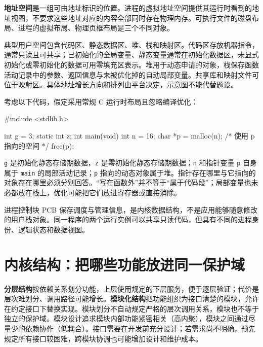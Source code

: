 \textbf{地址空间}是一组可由地址标识的位置。进程的虚拟地址空间提供其运行时看到的地址视图，不要求这些地址对应的内容全部同时存在物理内存。可执行文件的磁盘布局、进程的虚拟布局、物理页框布局是三个不同对象。

典型用户空间包含代码区、静态数据区、堆、栈和映射区。代码区存放机器指令，通常只读且可共享；已初始化的全局变量、静态变量通常在初始化数据区，未显式初始化或零初始化的数据可用零填充区表示。堆用于动态申请的对象，栈保存函数活动记录中的参数、返回信息与未被优化掉的自动局部变量。共享库和映射文件可位于映射区。具体地址增长方向和排列由平台决定，示意图不能代替题设。

考虑以下代码，假定采用常规 C 运行时布局且忽略编译优化：

\par\medskip\noindent\begin{minipage}{\linewidth}
\begin{codeblock}[language=C]
#include <stdlib.h>

int g = 3;
static int z;
int main(void) {
    int n = 16;
    char *p = malloc(n);
    /* 使用 p 指向的空间 */
    free(p);
}
\end{codeblock}
\end{minipage}\par\medskip

\texttt{g} 是初始化静态存储期数据，\texttt{z} 是零初始化静态存储期数据；\texttt{n} 和指针变量 \texttt{p} 自身属于 \texttt{main} 的局部活动记录；\texttt{p} 指向的动态对象属于堆。指针存在哪里与它指向的对象存在哪里必须分别回答。``写在函数外''并不等于``属于代码段''；局部变量也未必都放在栈上，优化可能把它们放进寄存器或直接消除。

进程控制块 PCB 保存调度与管理信息，是内核数据结构，不是应用能够随意修改的用户栈对象。同一程序的两个运行实例可以共享只读代码，但具有不同的进程身份、逻辑状态和数据视图。

\section{内核结构：把哪些功能放进同一保护域}\label{OS01-1-8}

\textbf{分层结构}按依赖关系划分功能，上层使用规定的下层服务，便于逐层验证；代价是层次难划分、调用路径可能增长。\textbf{模块化结构}把功能组织为接口清楚的模块，允许在约定接口下替换实现。模块划分不自动规定严格的层次调用关系，模块也不等于独立的保护域。模块设计追求模块内部功能紧密相关（高内聚），模块之间通过尽量少的依赖协作（低耦合）。接口需要在开发前充分设计；若需求尚不明确，预先规定所有接口较困难，跨模块协调也可能增加设计和维护成本。

